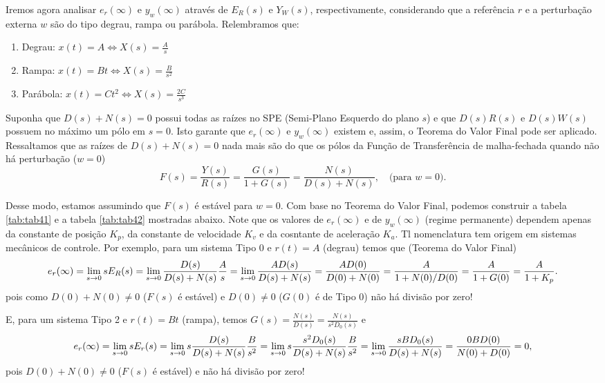 \documentclass[
]{book}
\providecommand{\tightlist}{%
  \setlength{\itemsep}{0pt}\setlength{\parskip}{0pt}}
\theoremstyle{definition}
\theoremstyle{definition}
\theoremstyle{definition}
\theoremstyle{remark}
\begin{document}
Iremos agora analisar \(e_r(\infty)\) e \(y_w(\infty)\) através de \(E_R(s)\) e \(Y_W(s)\), respectivamente, considerando que a referência \(r\) e a perturbação externa \(w\) são do tipo degrau, rampa ou parábola. Relembramos que:

\begin{enumerate}
\def\labelenumi{\arabic{enumi}.}
\tightlist
\item
  Degrau: \(x(t) = A \iff X(s) = \frac {A}{s}\)
\item
  Rampa: \(x(t) = Bt \iff X(s) = \frac {B}{s^2}\)
\item
  Parábola: \(x(t) = Ct^2 \iff X(s) = \frac {2C}{s^3}\)
\end{enumerate}

Suponha que \(D(s) + N(s) = 0\) possui todas as raízes no SPE (Semi-Plano Esquerdo do plano \(s\)) e que \(D(s)R(s)\) e \(D(s)W(s)\) possuem no máximo um pólo em \(s=0\). Isto garante que \(e_r(\infty)\) e \(y_w(\infty)\) existem e, assim, o Teorema do Valor Final pode ser aplicado. Ressaltamos que as raízes de \(D(s) + N(s) = 0\) nada mais são do que os pólos da Função de Transferência de malha-fechada quando não há perturbação (\(w=0\))
\[
F(s) = \frac {Y(s)}{R(s)} = \frac{G(s)}{1+G(s)} = \frac {N(s)}{D(s)+N(s)}, \quad \text{(para } w=0 \text{).} 
\]

Desse modo, estamos assumindo que \(F(s)\) é estável para \(w=0\). Com base no Teorema do Valor Final, podemos construir a tabela \ref{tab:tab41} e a tabela \ref{tab:tab42} mostradas abaixo. Note que os valores de \(e_r(\infty)\) e de \(y_w(\infty)\) (regime permanente) dependem apenas da constante de posição \(K_p\), da constante de velocidade \(K_v\) e da cosntante de aceleração \(K_a\). Tl nomenclatura tem origem em sistemas mecânicos de controle. Por exemplo, para um sistema Tipo 0 e \(r(t)=A\) (degrau) temos que (Teorema do Valor Final)
\[
e_r(\infty) = \lim\limits_{s \to 0}{sE_R(s)}=\lim\limits_{s\to0}{\frac{D(s)}{D(s)+N(s)}\frac{A}{s}} = \lim\limits_{s\to0}{\frac{AD(s)}{D(s)+N(s)}} \\
= \frac{AD(0)}{D(0) + N(0)} = \frac{A}{1+N(0)/D(0)} = \frac{A}{1+G(0)} = \frac {A}{1+K_p}.
\]
pois como \(D(0) + N(0) \neq 0\) (\(F(s)\) é estável) e \(D(0) \neq 0\) (\(G(0)\) é de Tipo 0) não há divisão por zero!

E, para um sistema Tipo 2 e \(r(t) = Bt\) (rampa), temos \(G(s) = \frac{N(s)}{D(s)} = \frac{N(s)}{s^2D_0(s)}\) e
\[
e_r(\infty) = \lim\limits_{s \to 0}{sE_r(s) = \lim\limits_{s \to 0}{s\frac{D(s)}{D(s)+N(s)}\frac{B}{s^2}}} = \lim\limits_{s \to 0}{s\frac{s^2D_0(s)}{D(s)+N(s)}\frac{B}{s^2}}\\
=\lim\limits_{s \to 0}{\frac{sBD_0(s)}{D(s)+N(s)}}=\frac{0BD(0)}{N(0)+D(0)}=0,
\]
pois \(D(0) + N(0) \neq 0\) (\(F(s)\) é estável) e não há divisão por zero!
\end{document}
